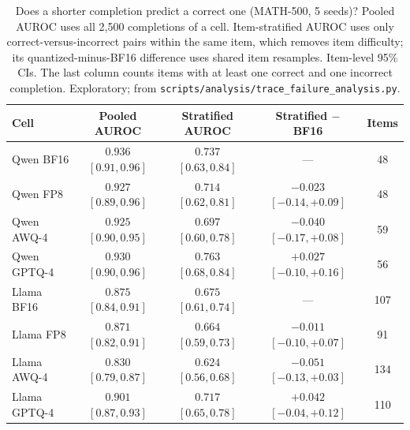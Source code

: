 \documentclass[11pt,a4paper]{article}
\begin{document}
\begin{table}[!htbp]
\centering
\caption{Does a shorter completion predict a correct one (MATH-500, 5 seeds)? Pooled AUROC uses all 2{,}500 completions of a cell. Item-stratified AUROC uses only correct-versus-incorrect pairs within the same item, which removes item difficulty; its quantized-minus-BF16 difference uses shared item resamples. Item-level 95\% CIs. The last column counts items with at least one correct and one incorrect completion. Exploratory; from \texttt{scripts/analysis/trace\_failure\_analysis.py}.}
\label{tab:auroc}
\footnotesize
\setlength{\tabcolsep}{3pt}
\begin{tabular}{lcccc}
\toprule
\textbf{Cell} & \textbf{Pooled AUROC} & \textbf{Stratified AUROC} & \textbf{Stratified $-$ BF16} & \textbf{Items} \\
\midrule
Qwen BF16 & $0.936$ $[0.91,0.96]$ & $0.737$ $[0.63,0.84]$ & --- & 48 \\
Qwen FP8 & $0.927$ $[0.89,0.96]$ & $0.714$ $[0.62,0.81]$ & $-0.023$ $[-0.14,+0.09]$ & 48 \\
Qwen AWQ-4 & $0.925$ $[0.90,0.95]$ & $0.697$ $[0.60,0.78]$ & $-0.040$ $[-0.17,+0.08]$ & 59 \\
Qwen GPTQ-4 & $0.930$ $[0.90,0.96]$ & $0.763$ $[0.68,0.84]$ & $+0.027$ $[-0.10,+0.16]$ & 56 \\
\midrule
Llama BF16 & $0.875$ $[0.84,0.91]$ & $0.675$ $[0.61,0.74]$ & --- & 107 \\
Llama FP8 & $0.871$ $[0.82,0.91]$ & $0.664$ $[0.59,0.73]$ & $-0.011$ $[-0.10,+0.07]$ & 91 \\
Llama AWQ-4 & $0.830$ $[0.79,0.87]$ & $0.624$ $[0.56,0.68]$ & $-0.051$ $[-0.13,+0.03]$ & 134 \\
Llama GPTQ-4 & $0.901$ $[0.87,0.93]$ & $0.717$ $[0.65,0.78]$ & $+0.042$ $[-0.04,+0.12]$ & 110 \\
\bottomrule
\end{tabular}
\end{table}

\FloatBarrier
\end{document}
